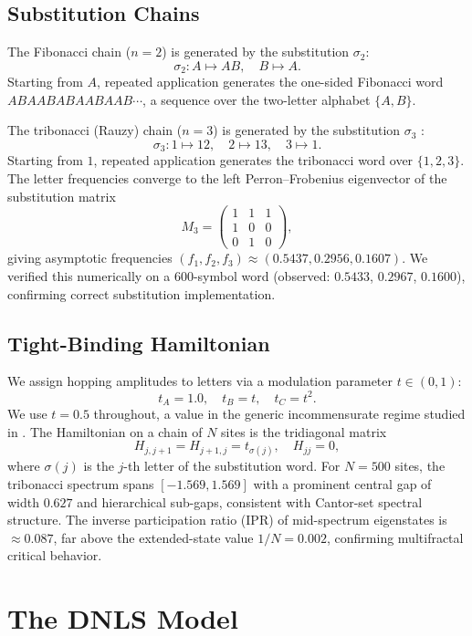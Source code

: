 \documentclass[12pt,a4paper]{article}
\begin{document}
\subsection{Substitution Chains}

The Fibonacci chain ($n=2$) is generated by the substitution $\sigma_2$:
\[
  \sigma_2: A \mapsto AB,\quad B \mapsto A.
\]
Starting from $A$, repeated application generates the one-sided Fibonacci
word $ABAABABAABAAB\cdots$, a sequence over the two-letter alphabet $\{A, B\}$.

The tribonacci (Rauzy) chain ($n=3$) is generated by the substitution
$\sigma_3$ \cite{Krebbekx2023,Rauzy1982}:
\[
  \sigma_3: 1 \mapsto 12,\quad 2 \mapsto 13,\quad 3 \mapsto 1.
\]
Starting from $1$, repeated application generates the tribonacci word over
$\{1, 2, 3\}$. The letter frequencies converge to the left Perron--Frobenius
eigenvector of the substitution matrix
\[
  M_3 = \begin{pmatrix} 1 & 1 & 1 \\ 1 & 0 & 0 \\ 0 & 1 & 0 \end{pmatrix},
\]
giving asymptotic frequencies $(f_1, f_2, f_3) \approx (0.5437, 0.2956, 0.1607)$.
We verified this numerically on a 600-symbol word (observed: $0.5433$,
$0.2967$, $0.1600$), confirming correct substitution implementation.

\subsection{Tight-Binding Hamiltonian}

We assign hopping amplitudes to letters via a modulation parameter $t \in
(0,1)$:
\[
  t_A = 1.0,\quad t_B = t,\quad t_C = t^2.
\]
We use $t = 0.5$ throughout, a value in the generic incommensurate regime
studied in \cite{Krebbekx2023}. The Hamiltonian on a chain of $N$ sites is
the tridiagonal matrix
\[
  H_{j,j+1} = H_{j+1,j} = t_{\sigma(j)}, \quad H_{jj} = 0,
\]
where $\sigma(j)$ is the $j$-th letter of the substitution word. For $N = 500$
sites, the tribonacci spectrum spans $[-1.569, 1.569]$ with a prominent
central gap of width $0.627$ and hierarchical sub-gaps, consistent with
Cantor-set spectral structure. The inverse participation ratio (IPR) of
mid-spectrum eigenstates is $\approx 0.087$, far above the extended-state
value $1/N = 0.002$, confirming multifractal critical behavior.

\section{The DNLS Model}
\end{document}
